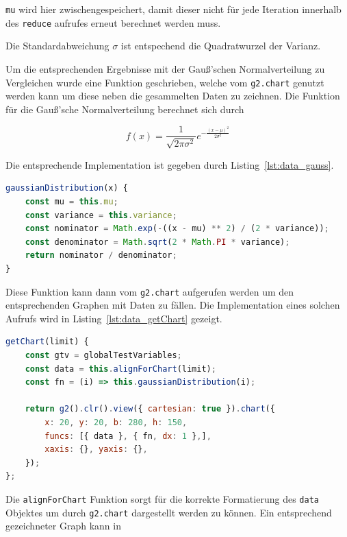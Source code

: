 \lstinline{mu} wird hier zwischengespeichert, damit dieser nicht für jede Iteration innerhalb des \lstinline{reduce} aufrufes erneut berechnet werden muss.

Die Standardabweichung $\sigma$ ist entspechend die Quadratwurzel der Varianz.

Um die entsprechenden Ergebnisse mit der Gau{\ss}'schen Normalverteilung zu Vergleichen wurde eine Funktion geschrieben, welche vom \lstinline{g2.chart} genutzt werden kann um diese neben die gesammelten Daten zu zeichnen.
Die Funktion für die Gau{\ss}'sche Normalverteilung berechnet sich durch

\begin{equation}
    f(x) = \frac{1}{\sqrt{2\pi\sigma^2}}e^{-\frac{(x-\mu)^2}{2\sigma^2}}
\end{equation}

Die entsprechende Implementation ist gegeben durch Listing~\ref{lst:data_gauss}.

\begin{lstlisting}[language=JavaScript, caption={Definition der \lstinline{gaussianDistribution} Funktion, welche die Normalverteilung für die gegebene Varianz und den Erwartungswert formt.}, label={lst:data_gauss}]
gaussianDistribution(x) {
    const mu = this.mu;
    const variance = this.variance;
    const nominator = Math.exp(-((x - mu) ** 2) / (2 * variance));
    const denominator = Math.sqrt(2 * Math.PI * variance);
    return nominator / denominator;
}
\end{lstlisting}

Diese Funktion kann dann vom \lstinline{g2.chart} aufgerufen werden um den entsprechenden Graphen mit Daten zu fällen.
Die Implementation eines solchen Aufrufs wird in Listing~\ref{lst:data_getChart} gezeigt.

\begin{lstlisting}[language=JavaScript, caption={Definition der \lstinline{getChart} Funktion der \lstinline{Data} Klasse.}, label={lst:data_getChart}]
getChart(limit) {
    const gtv = globalTestVariables;
    const data = this.alignForChart(limit);
    const fn = (i) => this.gaussianDistribution(i);

    return g2().clr().view({ cartesian: true }).chart({
        x: 20, y: 20, b: 280, h: 150,
        funcs: [{ data }, { fn, dx: 1 },],
        xaxis: {}, yaxis: {},
    });
};
\end{lstlisting}

Die \lstinline{alignForChart} Funktion sorgt für die korrekte Formatierung des \lstinline{data} Objektes um durch \lstinline{g2.chart} dargestellt werden zu können.
Ein entsprechend gezeichneter Graph kann in 

